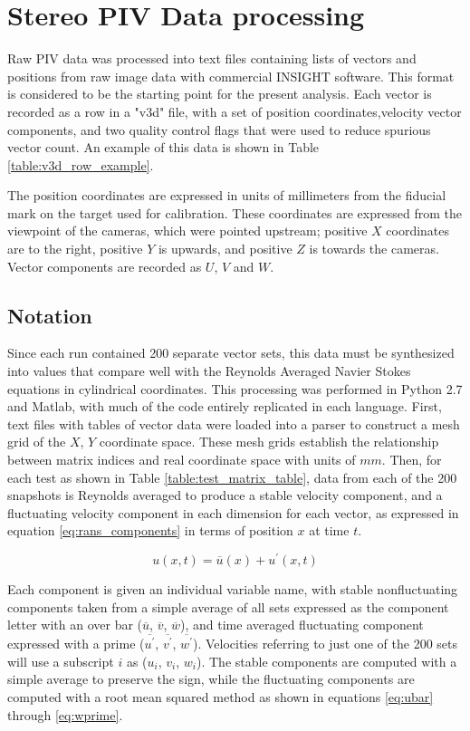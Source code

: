 \section{Stereo PIV Data processing}

Raw PIV data was processed into text files containing lists of vectors and 
positions from raw image data with commercial INSIGHT software. 
This format is considered to be the 
starting point for the present analysis. Each vector is recorded as a row in a 
"v3d" file, with a set of position coordinates,velocity 
vector components, and two quality control flags that were used to reduce 
spurious vector count. An example of this data is shown in Table 
\ref{table:v3d_row_example}.



The position coordinates are expressed in units of millimeters from 
the fiducial mark on the target used for calibration. These coordinates are 
expressed from the viewpoint of the cameras, which were pointed upstream; 
positive $X$ coordinates are to the right, positive $Y$ is upwards, and 
positive $Z$ is towards the cameras. Vector components are recorded as $U$, 
$V$ and $W$. 

\subsection{Notation}
Since each run contained 200 separate vector sets, this data must be 
synthesized into 
values that compare well with the Reynolds Averaged Navier Stokes equations in 
cylindrical coordinates. This processing was performed in Python 2.7 and 
Matlab, with much of the code entirely replicated in each language. 
First, text files with tables of vector data were loaded into a parser to 
construct a mesh grid of the $X$, $Y$ coordinate space. These mesh grids 
establish the relationship between matrix indices and real coordinate 
space with units of $mm$.
Then, for each test as shown in Table \ref{table:test_matrix_table}, data from 
each of the 200 snapshots is Reynolds averaged to produce a stable velocity 
component, and a fluctuating velocity component in each dimension for each 
vector, as expressed in equation \ref{eq:rans_components} in terms of position 
$x$ at time $t$.

\begin{equation}
u(x,t) = \overline{u}(x) + u^\prime(x,t)
\label{eq:rans_components}
\end{equation}


Each component is given an individual variable name, with stable nonfluctuating 
components taken from a simple average of all sets expressed as the component 
letter with an over bar ($\overline{u}$, $\overline{v}$, $\overline{w}$), and 
time averaged fluctuating component expressed with a prime 
($\overline{u^\prime}$, $\overline{v^\prime}$, $\overline{w^\prime}$). 
Velocities referring to just one of the 200 sets will use a 
subscript $i$ as ($u_i$, $v_i$, $w_i$). The stable components are computed with 
a simple average to preserve the sign, while the fluctuating components are 
computed with a root mean squared method as shown in equations \ref{eq:ubar} 
through \ref{eq:wprime}.

